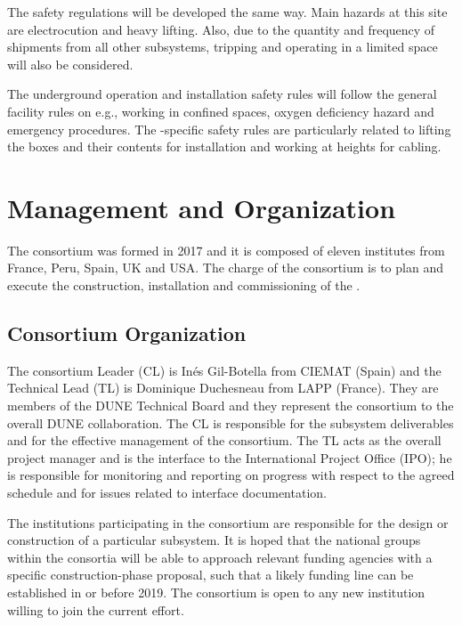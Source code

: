 The  \dual {} safety regulations will be developed the same way. Main hazards at this site are electrocution and heavy lifting. Also, due to the quantity and frequency of shipments from all other subsystems, tripping and operating in a limited space will also be considered.

The underground operation and installation safety rules will %
follow the general facility rules on e.g., working in confined spaces, oxygen deficiency hazard and emergency procedures. The \dual {}-specific safety rules are particularly related to lifting the boxes and their contents %
for installation and working at heights for cabling.

\section{Management and Organization}
\label{sec:fddp-pd-12}

The \dual {} consortium was formed in 2017 and it is composed of eleven institutes from France, Peru, Spain, UK and USA. The charge of the \dual {} consortium is to plan and execute the construction, installation and commissioning of the  .


\subsection{Consortium Organization}
\label{sec:fddp-pd-12.1}

The \dual {} consortium Leader (CL) is In\'{e}s Gil-Botella from CIEMAT (Spain) and the Technical Lead (TL) is Dominique Duchesneau from LAPP (France). They are members of the DUNE Technical Board and they represent the consortium to the overall DUNE collaboration. The CL is responsible for the subsystem deliverables and for the effective management of the consortium. The TL acts as the overall project manager and is the interface to the International Project Office (IPO); he is responsible for monitoring and reporting on progress with respect to the agreed schedule and for issues related to interface documentation.

The institutions participating in the consortium are responsible for the design or construction of a particular subsystem. It is hoped that the national groups within the consortia will be able to approach relevant funding agencies with a specific construction-phase proposal, such that a likely funding line can be established in or before 2019. The \dual {} consortium is open to any new institution willing to join the current effort.


